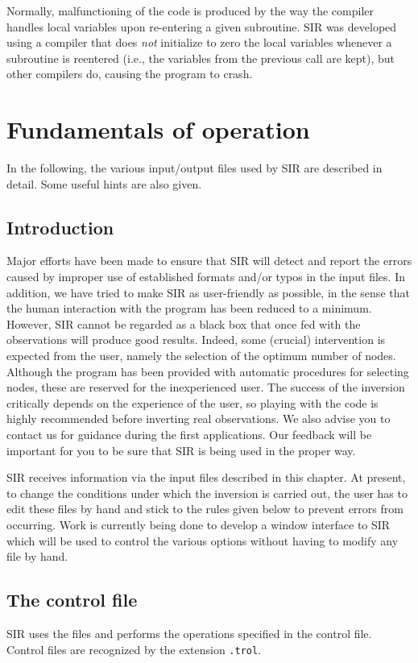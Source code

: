 Normally, malfunctioning of the code is produced by the way the
compiler handles local variables upon re-entering a given subroutine.
SIR was developed using a compiler that does {\em not} initialize to
zero the local variables whenever a subroutine is reentered (i.e., the
variables from the previous call are kept), but other compilers do,
causing the program to crash.



\chapter{Fundamentals of operation}
In the following, the various input/output files used by SIR are 
described in detail. Some useful hints are also given.  

\section{Introduction}
Major efforts have been made to ensure that SIR will detect and report
the errors caused by improper use of established formats and/or typos
in the input files. In addition, we have tried to make SIR as
user-friendly as possible, in the sense that the human interaction with
the program has been reduced to a minimum.  However, SIR cannot be
regarded as a black box that once fed with the observations will
produce good results. Indeed, some (crucial) intervention is
expected from the user, namely the selection of the optimum number of
nodes. Although the program has been provided with automatic procedures
for selecting nodes, these are reserved for the inexperienced user. The
success of the inversion critically depends on the experience of the
user, so playing with the code is highly recommended before inverting
real observations. We also advise you to contact us for guidance during 
the first applications. Our feedback will be important for you to be 
sure that SIR is being used in the proper way.  

SIR receives information via the input files described in this chapter.
At present, to change the conditions under which the inversion is
carried out, the user has to edit these files by hand and stick to the
rules given below to prevent errors from occurring. Work is currently
being done to develop a window interface to SIR which will be
used to control the various options without having to modify any file
by hand.    

\section{The control file}
SIR uses the files and performs the operations specified in the 
control file. Control files are recognized by the extension {\tt .trol}. 
 
